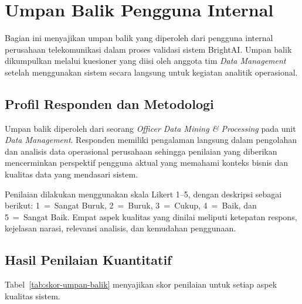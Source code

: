 \section{Umpan Balik Pengguna Internal}
\label{sec:umpan-balik-internal}

Bagian ini menyajikan umpan balik yang diperoleh dari pengguna internal perusahaan telekomunikasi dalam proses validasi sistem BrightAI. Umpan balik dikumpulkan melalui kuesioner yang diisi oleh anggota tim \textit{Data Management} setelah menggunakan sistem secara langsung untuk kegiatan analitik operasional.

\subsection{Profil Responden dan Metodologi}

Umpan balik diperoleh dari seorang \textit{Officer Data Mining \& Processing} pada unit \textit{Data Management}. Responden memiliki pengalaman langsung dalam pengolahan dan analisis data operasional perusahaan sehingga penilaian yang diberikan mencerminkan perspektif pengguna aktual yang memahami konteks bisnis dan kualitas data yang mendasari sistem.

Penilaian dilakukan menggunakan skala Likert 1--5, dengan deskripsi sebagai berikut: 1~=~Sangat Buruk, 2~=~Buruk, 3~=~Cukup, 4~=~Baik, dan 5~=~Sangat Baik. Empat aspek kualitas yang dinilai meliputi ketepatan respons, kejelasan narasi, relevansi analisis, dan kemudahan penggunaan.

\subsection{Hasil Penilaian Kuantitatif}

Tabel~\ref{tab:skor-umpan-balik} menyajikan skor penilaian untuk setiap aspek kualitas sistem.

